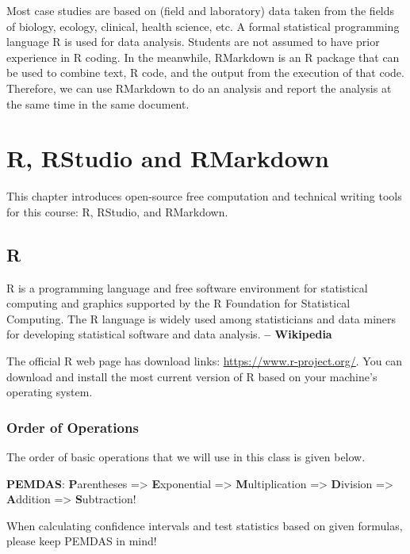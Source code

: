 \documentclass[
]{book}
\begin{document}
Most case studies are based on (field and laboratory) data taken from the fields of biology, ecology, clinical, health science, etc. A formal statistical programming language R is used for data analysis. Students are not assumed to have prior experience in R coding. In the meanwhile, RMarkdown is an R package that can be used to combine text, R code, and the output from the execution of that code. Therefore, we can use RMarkdown to do an analysis and report the analysis at the same time in the same document.

\hypertarget{r-rstudio-and-rmarkdown}{%
\chapter{R, RStudio and RMarkdown}\label{r-rstudio-and-rmarkdown}}

This chapter introduces open-source free computation and technical writing tools for this course: R, RStudio, and RMarkdown.

\hypertarget{r}{%
\section{R}\label{r}}

R is a programming language and free software environment for statistical computing and graphics supported by the R Foundation for Statistical Computing. The R language is widely used among statisticians and data miners for developing statistical software and data analysis. \textbf{-- Wikipedia}

The official R web page has download links: \url{https://www.r-project.org/}. You can download and install the most current version of R based on your machine's operating system.

\hypertarget{order-of-operations}{%
\subsection{Order of Operations}\label{order-of-operations}}

The order of basic operations that we will use in this class is given below.

\textbf{PEMDAS}: \textbf{P}arentheses =\textgreater{} \textbf{E}xponential =\textgreater{} \textbf{M}ultiplication =\textgreater{} \textbf{D}ivision =\textgreater{} \textbf{A}ddition =\textgreater{} \textbf{S}ubtraction!

When calculating confidence intervals and test statistics based on given formulas, please keep { PEMDAS } in mind!
\end{document}

